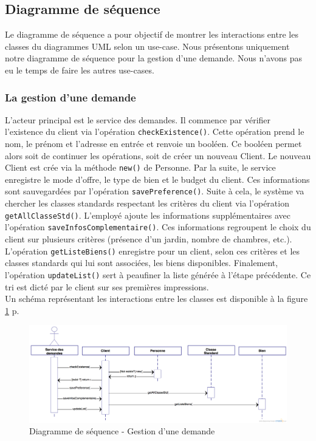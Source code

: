 \subsection{Diagramme de séquence}
Le diagramme de séquence a pour objectif de montrer les interactions entre les classes du diagrammes UML selon un use-case.
Nous présentons uniquement notre diagramme de séquence pour la gestion d'une demande.
Nous n'avons pas eu le temps de faire les autres use-cases.

\subsubsection{La gestion d'une demande}
L'acteur principal est le service des demandes. 
Il commence par vérifier l'existence du client via l'opération \texttt{checkExistence()}.
Cette opération prend le nom, le prénom et l'adresse en entrée et renvoie un booléen.
Ce booléen permet alors soit de continuer les opérations, soit de créer un nouveau Client.
Le nouveau Client est crée via la méthode \texttt{new()} de Personne.
Par la suite, le service enregistre le mode d'offre, le type de bien et le budget du client.
Ces informations sont sauvegardées par l'opération \texttt{savePreference()}.
Suite à cela, le système va chercher les classes standards respectant les critères du client via l'opération \texttt{getAllClasseStd()}.
L'employé ajoute les informations supplémentaires avec l'opération \texttt{saveInfosComplementaire()}.
Ces informations regroupent le choix du client sur plusieurs critères (présence d'un jardin, nombre de chambres, etc.).
L'opération \texttt{getListeBiens()} enregistre pour un client, selon ces critères et les classes standards qui lui sont associées, les biens disponibles.
Finalement, l'opération \texttt{updateList()} sert à peaufiner la liste générée à l'étape précédente.
Ce tri est dicté par le client sur ses premières impressions.\\

Un schéma représentant les interactions entre les classes est disponible à la figure \ref{fig:sequence} p.\pageref{fig:sequence}

\newpage
\begin{landscape}
	\begin{figure}
		\centering
		\includegraphics[width=23cm]{Sequence-DemandeBien.png}
		\caption{Diagramme de séquence - Gestion d'une demande}
		\label{fig:sequence}
	\end{figure}	 
\end{landscape}